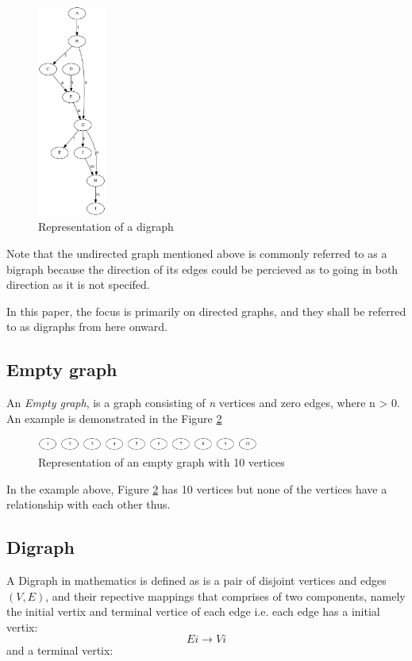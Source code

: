 \begin{figure}[H]
  \begin{center}
      \includegraphics[width=0.2\textwidth]{directedgraph.png}
  \end{center}    
  \caption{Representation of a digraph}
  \label{fig:directedgraph}
\end{figure} 
Note that the undirected graph mentioned above is commonly referred to as a bigraph because the direction
of its edges could be percieved as to going in both direction as it is not specifed.

In this paper, the focus is primarily on directed graphs, and they shall be referred to as digraphs from here onward.


\subsection{Empty graph}
An \textit{Empty graph}, is a graph consisting of \textit{n} vertices and zero edges, where n > 0. An example is demonstrated in the Figure \ref{fig:empty_graph}
\begin{figure}[H]
  \begin{center}
      \includegraphics[width=0.65\textwidth]{empty.png}
  \end{center}    
  \caption{Representation of an empty graph with 10 vertices}
  \label{fig:empty_graph}
\end{figure}

In the example above, Figure \ref{fig:empty_graph} has 10 vertices but none of the vertices have a relationship with each other thus.

\subsection{Digraph}
A Digraph in mathematics is defined as is a pair of disjoint vertices and edges $(V,E)$, and their repective mappings that comprises of two components, namely the initial vertix and 
terminal vertice of each edge i.e. each edge has a initial vertix: 
  \begin{equation}
    Ei\rightarrow Vi
  \end{equation} 
 and a terminal vertix:

